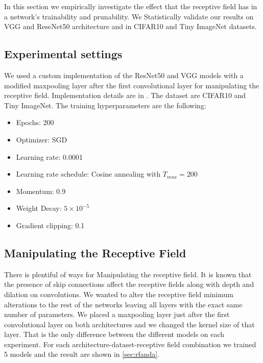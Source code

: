 

 In this section we empirically investigate the effect that the receptive field has in a network's trainability and
 prunability. We Statistically validate our results on VGG and ReseNet50 architecture and in CIFAR10 and Tiny ImageNet
 datasets. 




\subsection{Experimental settings}
We used a custom implementation of the ResNet50 and VGG models with a modified maxpooling layer after the first
convolutional layer for manipulating the receptive field. Implementation details are in . The dataset are CIFAR10 and Tiny ImageNet. The training hyperparameters are the following:
\begin{itemize}
  \setlength\itemsep{.0em}
    \item Epochs: 200
    \item Optimizer: SGD
    \item Learning rate: 0.0001
    \item Learning rate schedule: Cosine annealing with $T_{max}=200$ 
    \item Momentum: 0.9
    \item Weight Decay: $5 \times 10^{-5}$
    \item Gradient clipping: 0.1
\end{itemize}


\subsection{Manipulating the Receptive Field}

There is plentiful of ways for Manipulating the receptive field. It is known that the presence of skip connections
affect the receptive fields along with depth and dilation on convolutions. We wanted to alter the receptive field
minimum alterations to the rest of the networks leaving all layers with the exact same number of parameters. We placed a
maxpooling layer just after the first convolutional layer on both architectures and we changed the kernel size of that
layer. That is the only difference between the different models on each experiment. For each
architecture-dataset-receptive field combination we trained 5 models and the result are shown in \ref{sec:rfanda}.
